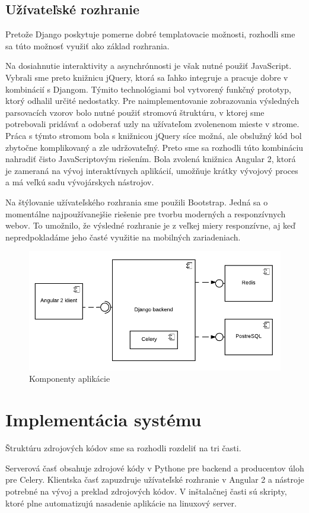 \subsection{Užívateľské rozhranie}
Pretože Django poskytuje pomerne dobré templatovacie možnosti, rozhodli sme sa túto možnosť využiť ako základ rozhrania.
\par Na dosiahnutie interaktivity a asynchrónnosti je však nutné použiť JavaScript. Vybrali sme preto knižnicu jQuery, ktorá sa ľahko integruje a pracuje dobre v kombinácií s Djangom. Týmito technológiami bol vytvorený funkčný prototyp, ktorý odhalil určité nedostatky. Pre naimplementovanie zobrazovania výsledných parsovacích vzorov bolo nutné použiť stromovú štruktúru, v ktorej sme potrebovali pridávať a odoberať uzly na užívateľom zvolenenom mieste v strome. Práca s týmto stromom bola s knižnicou jQuery síce možná, ale obslužný kód bol zbytočne komplikovaný a zle udržovateľný. Preto sme sa rozhodli túto kombináciu nahradiť čisto JavaScriptovým riešením. Bola zvolená knižnica Angular 2, ktorá je zameraná na vývoj interaktívnych aplikácií, umožňuje krátky vývojový proces a má veľkú sadu vývojárskych nástrojov.
\par Na štýlovanie užívateľského rozhrania sme použili Bootstrap. Jedná sa o momentálne najpoužívanejšie riešenie pre tvorbu moderných a responzívnych webov. To umožnilo, že výsledné rozhranie je z veľkej miery responzívne, aj keď nepredpokladáme jeho časté využitie na mobilných zariadeniach.

\begin{figure}[htbp]
 \centering 
 \begin{minipage}{0.95\linewidth}
 	\centering
 	\includegraphics[width=\textwidth]{Images/thesis-component-diagram.pdf}	
 \end{minipage}
  \caption{Komponenty aplikácie }
  \label{fig:components}
\end{figure}

\section{Implementácia systému}
Štruktúru zdrojových kódov sme sa rozhodli rozdeliť na tri časti.
\par Serverová časť obsahuje zdrojové kódy v Pythone pre backend a producentov úloh pre Celery. Klientska časť zapuzdruje užívateľské rozhranie v Angular 2 a nástroje potrebné na vývoj a preklad zdrojových kódov. V inštalačnej časti sú skripty, ktoré plne automatizujú nasadenie aplikácie na linuxový server.